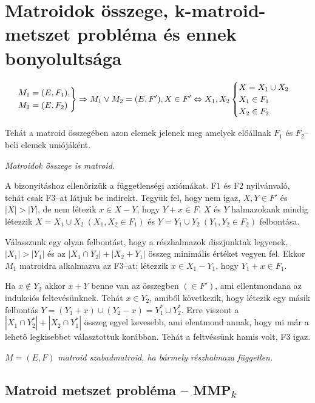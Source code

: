 \newpage
\section{Matroidok összege, k-matroid-metszet probléma és ennek bonyolultsága}

\[
\begin{rcases}
M_1=(E,F_1), \\
M_2=(E,F_2)
\end{rcases} 
\Rightarrow
M_1 \vee M_2  = (E,F'), X \in F' \Leftrightarrow X_1, X_2 
\begin{cases}
X=X_1 \cup X_2 \\
X_1 \in F_1\\
X_2 \in F_2
\end{cases}
\]

Tehát a matroid összegében azon elemek jelenek meg amelyek előállnak $F_1$ és
$F_2$--beli elemek uniójáként. 

\vspace{0.4cm}
\emph{Matroidok összege is matroid.}
\vspace{0.4cm}

A bizonyitáshoz ellenőrizük a függetlenségi axiómákat. F$1$ és F$2$ nyilvánvaló,
tehát csak F$3$--at látjuk be indirekt. Tegyük fel, hogy nem igaz, $X,Y \in F'$
és $|X|>|Y|$, de nem létezik $x \in X-Y$, hogy $Y+x \in F$. $X$ és $Y$
halmazokank mindig létezzik $X=X_1 \cup X_2~(X_1, X_2 \in F_1)$ és $Y=Y_1 \cup
Y_2~(Y_1, Y_2 \in F_2)$ felbontása.

Válasszunk egy olyan felbontást, hogy a részhalmazok diszjunktak legyenek,
$|X_1|>|Y_1|$ és az $|X_1 \cap Y_2|+|X_2+Y_1|$ összeg minimális értéket vegyen
fel. Ekkor $M_1$ matroidra alkalmazva az F$3$--at: létezzik $x \in X_1-Y_1$,
hogy $Y_1+x \in F_1$.

Ha $x \not \in Y_2$ akkor $x+Y $ benne van az összegben $(\in F')$, ami
ellentmondana az indukciós feltevésünknek. Tehát $x \in Y_2$, amiből következik,
hogy létezik egy másik felbontás $Y=(Y_1+x) \cup (Y_2 -x)=Y_1^* \cup Y_2^*$.
Erre viszont a $|X_1\cap Y_2^*|+|X_2 \cap Y_1^*|$ összeg egyel kevesebb, ami
elentmond annak, hogy mi már a lehető legkisebbet választottuk korábban. Tehát a
feltvéssünk hamis volt, F$3$ igaz.

\vspace{0.4cm}
\emph{$M=(E,F)$ matroid szabadmatroid, ha bármely részhalmaza független.}

\subsection{\texorpdfstring{Matroid metszet probléma -- MMP\textsubscript{$k$}}{Matroid metszet probléma -- MMPk}}

